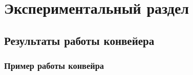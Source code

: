 \chapter{ Экспериментальный раздел}
\section{ Результаты работы конвейера}

\subsection{ Пример работы конвейра}
